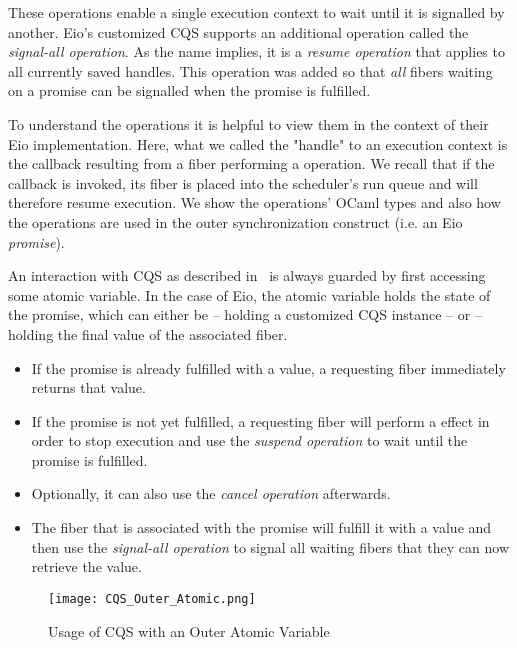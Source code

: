 
These operations enable a single execution context to wait until it is signalled by another.
Eio's customized CQS supports an additional operation called the \textit{signal-all operation}.
As the name implies, it is a \textit{resume operation} that applies to all currently saved handles.
This operation was added so that \textit{all} fibers waiting on a promise can be signalled when the promise is fulfilled.


To understand the operations it is helpful to view them in the context of their Eio implementation.
Here, what we called the "handle" to an execution context is the  callback resulting from a fiber performing a \esuspend{} operation.
We recall that if the  callback is invoked, its fiber is placed into the scheduler's run queue and will therefore resume execution.
We show the operations' OCaml types and also how the operations are used in the outer synchronization construct (i.e. an Eio \textit{promise}).


An interaction with CQS as described in~\cite{koval2023cqs} is always guarded by first accessing some atomic variable.
In the case of Eio, the atomic variable holds the state of the promise, which can either be  -- holding a customized CQS instance -- or  -- holding the final value  of the associated fiber.

\begin{itemize}
  \item If the promise is already fulfilled with a value, a requesting fiber immediately returns that value.
  \item If the promise is not yet fulfilled, a requesting fiber will perform a \esuspend{} effect in order to stop execution and use the \textit{suspend operation} to wait until the promise is fulfilled.
  \item Optionally, it can also use the \textit{cancel operation} afterwards.
  \item The fiber that is associated with the promise will fulfill it with a value and then use the \textit{signal-all operation} to signal all waiting fibers that they can now retrieve the value.
\end{itemize}

\begin{figure}[ht]
  \texttt{[image: CQS\_Outer\_Atomic.png]}
  \caption{Usage of CQS with an Outer Atomic Variable}
\end{figure}

